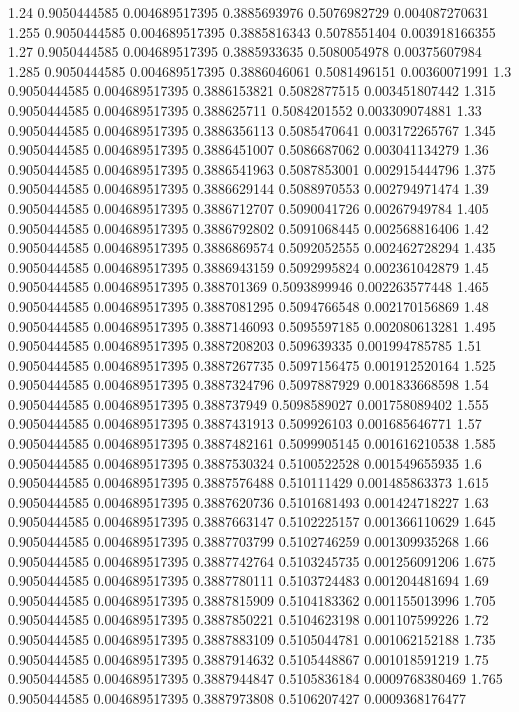 {1.24 0.9050444585 0.004689517395 0.3885693976 0.5076982729 0.004087270631
1.255 0.9050444585 0.004689517395 0.3885816343 0.5078551404 0.003918166355
1.27 0.9050444585 0.004689517395 0.3885933635 0.5080054978 0.00375607984
1.285 0.9050444585 0.004689517395 0.3886046061 0.5081496151 0.00360071991
1.3 0.9050444585 0.004689517395 0.3886153821 0.5082877515 0.003451807442
1.315 0.9050444585 0.004689517395 0.388625711 0.5084201552 0.003309074881
1.33 0.9050444585 0.004689517395 0.3886356113 0.5085470641 0.003172265767
1.345 0.9050444585 0.004689517395 0.3886451007 0.5086687062 0.003041134279
1.36 0.9050444585 0.004689517395 0.3886541963 0.5087853001 0.002915444796
1.375 0.9050444585 0.004689517395 0.3886629144 0.5088970553 0.002794971474
1.39 0.9050444585 0.004689517395 0.3886712707 0.5090041726 0.00267949784
1.405 0.9050444585 0.004689517395 0.3886792802 0.5091068445 0.002568816406
1.42 0.9050444585 0.004689517395 0.3886869574 0.5092052555 0.002462728294
1.435 0.9050444585 0.004689517395 0.3886943159 0.5092995824 0.002361042879
1.45 0.9050444585 0.004689517395 0.388701369 0.5093899946 0.002263577448
1.465 0.9050444585 0.004689517395 0.3887081295 0.5094766548 0.002170156869
1.48 0.9050444585 0.004689517395 0.3887146093 0.5095597185 0.002080613281
1.495 0.9050444585 0.004689517395 0.3887208203 0.509639335 0.001994785785
1.51 0.9050444585 0.004689517395 0.3887267735 0.5097156475 0.001912520164
1.525 0.9050444585 0.004689517395 0.3887324796 0.5097887929 0.001833668598
1.54 0.9050444585 0.004689517395 0.388737949 0.5098589027 0.001758089402
1.555 0.9050444585 0.004689517395 0.3887431913 0.509926103 0.001685646771
1.57 0.9050444585 0.004689517395 0.3887482161 0.5099905145 0.001616210538
1.585 0.9050444585 0.004689517395 0.3887530324 0.5100522528 0.001549655935
1.6 0.9050444585 0.004689517395 0.3887576488 0.510111429 0.001485863373
1.615 0.9050444585 0.004689517395 0.3887620736 0.5101681493 0.001424718227
1.63 0.9050444585 0.004689517395 0.3887663147 0.5102225157 0.001366110629
1.645 0.9050444585 0.004689517395 0.3887703799 0.5102746259 0.001309935268
1.66 0.9050444585 0.004689517395 0.3887742764 0.5103245735 0.001256091206
1.675 0.9050444585 0.004689517395 0.3887780111 0.5103724483 0.001204481694
1.69 0.9050444585 0.004689517395 0.3887815909 0.5104183362 0.001155013996
1.705 0.9050444585 0.004689517395 0.3887850221 0.5104623198 0.001107599226
1.72 0.9050444585 0.004689517395 0.3887883109 0.5105044781 0.001062152188
1.735 0.9050444585 0.004689517395 0.3887914632 0.5105448867 0.001018591219
1.75 0.9050444585 0.004689517395 0.3887944847 0.5105836184 0.0009768380469
1.765 0.9050444585 0.004689517395 0.3887973808 0.5106207427 0.0009368176477
}
